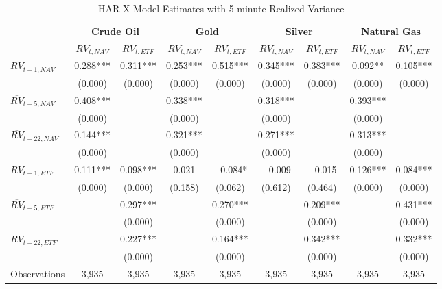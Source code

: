 \begin{landscape}
\begin{table}[htbp]
\centering
\caption{HAR-X Model Estimates with 5-minute Realized Variance}
\label{tab:HAR_5min}
\begin{threeparttable}
\footnotesize
\begin{tabular}{@{}lcccccccc@{}}
\toprule
 & \multicolumn{2}{c}{\textbf{Crude Oil}} & \multicolumn{2}{c}{\textbf{Gold}} & \multicolumn{2}{c}{\textbf{Silver}} & \multicolumn{2}{c}{\textbf{Natural Gas}} \\
\cmidrule(lr){2-3} \cmidrule(lr){4-5} \cmidrule(lr){6-7} \cmidrule(lr){8-9}
 & $RV_{t,NAV}$ & $RV_{t,ETF}$ & $RV_{t,NAV}$ & $RV_{t,ETF}$ & $RV_{t,NAV}$ & $RV_{t,ETF}$ & $RV_{t,NAV}$ & $RV_{t,ETF}$ \\
\midrule
$RV_{t-1,NAV}$ & 0.288*** & 0.311*** & 0.253*** & 0.515*** & 0.345*** & 0.383*** & 0.092** & 0.105*** \\
               & (0.000) & (0.000) & (0.000) & (0.000) & (0.000) & (0.000) & (0.000) & (0.000) \\
\addlinespace[0.1cm]
$\overline{RV}_{t-5,NAV}$ & 0.408*** &  & 0.338*** &  & 0.318*** &  & 0.393*** &  \\
                         & (0.000) &  & (0.000) &  & (0.000) &  & (0.000) &  \\
\addlinespace[0.1cm]
$\overline{RV}_{t-22,NAV}$ & 0.144*** &  & 0.321*** &  & 0.271*** &  & 0.313*** &  \\
                          & (0.000) &  & (0.000) &  & (0.000) &  & (0.000) &  \\
\addlinespace[0.1cm]
$RV_{t-1,ETF}$ & 0.111*** & 0.098*** & 0.021 & $-$0.084* & $-$0.009 & $-$0.015 & 0.126*** & 0.084*** \\
               & (0.000) & (0.000) & (0.158) & (0.062) & (0.612) & (0.464) & (0.000) & (0.000) \\
\addlinespace[0.1cm]
$\overline{RV}_{t-5,ETF}$ &  & 0.297*** &  & 0.270*** &  & 0.209*** &  & 0.431*** \\
                         &  & (0.000) &  & (0.000) &  & (0.000) &  & (0.000) \\
\addlinespace[0.1cm]
$\overline{RV}_{t-22,ETF}$ &  & 0.227*** &  & 0.164*** &  & 0.342*** &  & 0.332*** \\
                          &  & (0.000) &  & (0.000) &  & (0.000) &  & (0.000) \\
\midrule
Observations & 3,935 & 3,935 & 3,935 & 3,935 & 3,935 & 3,935 & 3,935 & 3,935 \\

\end{tabular}
\end{threeparttable}
\end{table}
\end{landscape}
